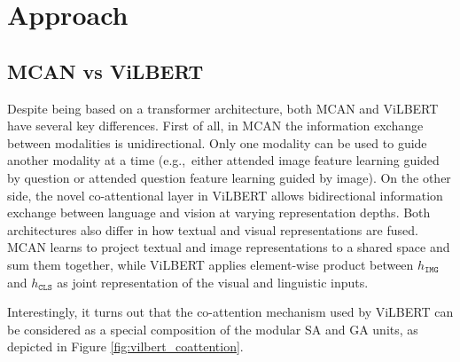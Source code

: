 \documentclass{article}
\begin{document}


\section{Approach}
\subsection{MCAN vs ViLBERT}
Despite being based on a transformer architecture, both MCAN and ViLBERT have several key differences. First of all, in MCAN the information exchange between modalities is unidirectional. Only one modality can be used to guide another modality at a time (e.g.,\ either attended image feature learning guided by question or attended question feature learning guided by image). On the other side, the novel co-attentional layer in ViLBERT allows bidirectional information exchange between language and vision at varying representation depths. Both architectures also differ in how textual and visual representations are fused. MCAN learns to project textual and image representations to a shared space and sum them together, while ViLBERT applies element-wise product between $h_{\mathtt{IMG}}$ and $h_{\mathtt{CLS}}$ as joint representation of the visual and linguistic inputs. 

Interestingly, it turns out that the co-attention mechanism used by ViLBERT can be considered as a special composition of the modular SA and GA units, as depicted in Figure \ref{fig:vilbert_coattention}.
\end{document}

